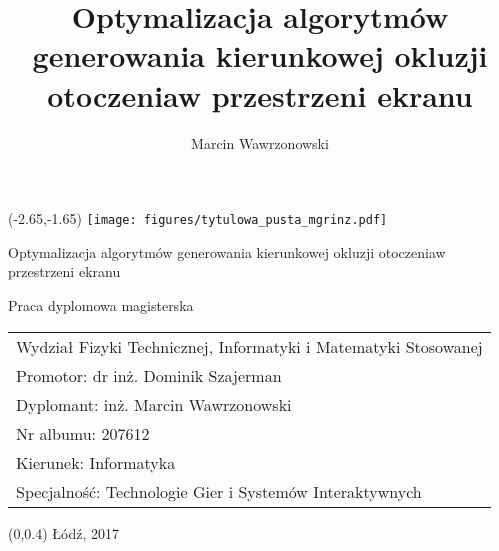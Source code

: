 \documentclass[12pt, oneside, a4paper]{mwbk}
\newcommand\blankpage{%
	\null
	\thispagestyle{empty}%
	\newpage}
\begin{document}
\author{Marcin Wawrzonowski}
\title{Optymalizacja algorytmów generowania kierunkowej okluzji otoczenia\linebreak w przestrzeni ekranu}
\begin{titlepage}
\thispagestyle{empty}
\begin{textblock}{1}(-2.65,-1.65)
\texttt{[image: figures/tytulowa\_pusta\_mgrinz.pdf]}
\end{textblock}
\vspace{7.3cm}
\begin{center}
\selectfont
\Huge
Optymalizacja algorytmów generowania kierunkowej okluzji otoczenia\linebreak w przestrzeni ekranu
\end{center}
\begin{center}
\selectfont
Praca dyplomowa magisterska
\end{center}
\vspace{5.0cm}
\begin{center}
\selectfont
\hspace{-1cm}
\begin{tabular}{l}
Wydział Fizyki Technicznej, Informatyki i Matematyki Stosowanej \\
Promotor: dr inż. Dominik Szajerman \\
Dyplomant: inż. Marcin Wawrzonowski \\
Nr albumu: 207612 \\
Kierunek: Informatyka \\
Specjalność: Technologie Gier i Systemów Interaktywnych
\end{tabular}
\end{center}
\vspace{-.5cm}
\begin{center}
\selectfont
\begin{textblock}{13}(0,0.4)
Łódź, 2017
\end{textblock}
\end{center}
\end{titlepage}

\blankpage

\tableofcontents












\end{document}
